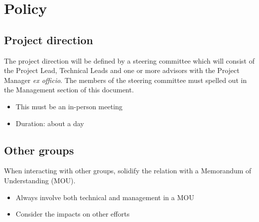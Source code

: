\documentclass{article}
\begin{document}
\section*{Policy}
\subsection*{Project direction}
The project direction will be defined by a steering committee which will
consist of the Project Lead, Technical Leads and one or more advisors with
the Project Manager \emph{ex officio}. The members of the steering committee
must spelled out in the Management section of this document.

\begin{itemize}
\item This must be an in-person meeting
\item Duration: about a day
\end{itemize}

\subsection*{Other groups}
When interacting with other groups, solidify the relation with a Memorandum
of Understanding (MOU).
\begin{itemize}
\item Always involve both technical and management in a MOU
\item Consider the impacts on other efforts
\end{itemize}
\end{document}
